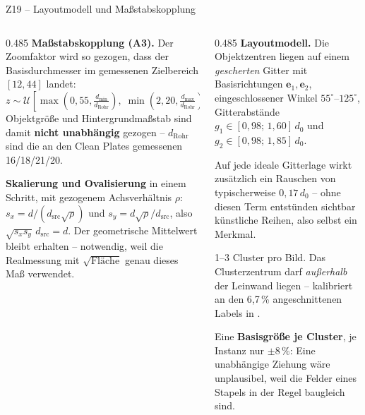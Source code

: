 \documentclass[14pt,aspectratio=169]{beamer}
\begin{document}
\begin{frame}{Z19 -- Layoutmodell und Maßstabskopplung}
\zusatzdicht
\begin{columns}[T,onlytextwidth]
\begin{column}{0.485\textwidth}
\textbf{Maßstabskopplung (A3).} Der Zoomfaktor wird so gezogen, dass der
Basisdurchmesser im gemessenen Zielbereich $[12,44]$\px{} landet:
\[z \sim \mathcal{U}\!\left[\max\!\left(0{,}55,\tfrac{d_{\min}}{d_{\text{Rohr}}}\right),\;
  \min\!\left(2{,}20,\tfrac{d_{\max}}{d_{\text{Rohr}}}\right)\right]\]
Objektgröße und Hintergrundmaßstab sind damit \textbf{nicht unabhängig}
gezogen -- $d_{\text{Rohr}}$ sind die an den Clean Plates gemessenen
16/18/21/20\px.
\smallskip

\textbf{Skalierung und Ovalisierung} in einem Schritt, mit gezogenem
Achsverhältnis $\rho$: $s_x = d/(d_{\text{src}}\sqrt\rho)$ und
$s_y = d\sqrt\rho/d_{\text{src}}$, also
$\sqrt{s_x s_y}\,d_{\text{src}} = d$. Der geometrische Mittelwert bleibt
erhalten -- notwendig, weil die Realmessung mit $\sqrt{\text{Fläche}}$ genau
dieses Maß verwendet.
\end{column}
\begin{column}{0.485\textwidth}
\textbf{Layoutmodell.} Die Objektzentren liegen auf einem \emph{gescherten}
Gitter mit Basisrichtungen $\mathbf{e}_1, \mathbf{e}_2$, eingeschlossener
Winkel $55^\circ$--$125^\circ$, Gitterabstände
$g_1 \in [0{,}98;\,1{,}60]\,d_0$ und $g_2 \in [0{,}98;\,1{,}85]\,d_0$.
\smallskip

Auf jede ideale Gitterlage wirkt zusätzlich ein Rauschen von typischerweise
$0{,}17\,d_0$ -- {\color{akzent}ohne diesen Term entstünden sichtbar
künstliche Reihen, also selbst ein Merkmal.}
\smallskip

1--3 Cluster pro Bild. Das Clusterzentrum darf \emph{außerhalb} der Leinwand
liegen -- kalibriert an den 6{,}7\,\% angeschnittenen Labels in .
\smallskip

Eine \textbf{Basisgröße je Cluster}, je Instanz nur $\pm 8\,\%$: Eine
unabhängige Ziehung wäre unplausibel, weil die Felder eines Stapels in der
Regel baugleich sind.
\end{column}
\end{columns}
\end{frame}
\end{document}
